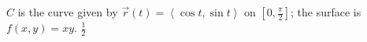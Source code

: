 {$C$ is the curve given by $\vec r(t)=\left<\cos t, \sin t\right>$ on $\left[0,\frac{\pi}{2}\right]$; the surface is $f(x,y)=xy$. 
}
{$\frac{1}{2}$}
